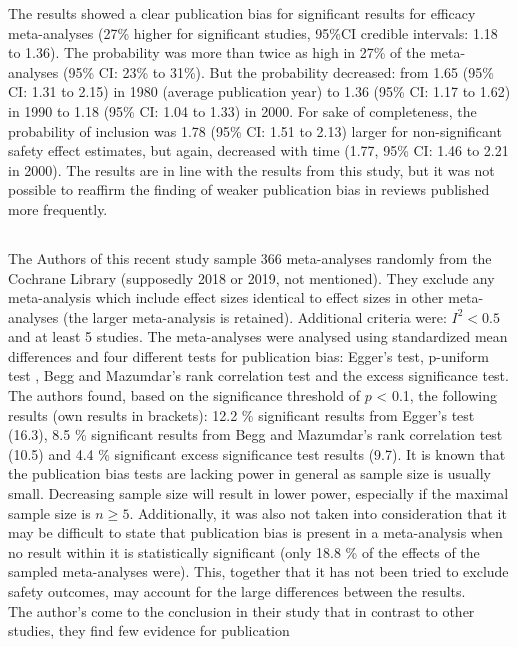 \documentclass[11pt,a4paper,twoside]{book}\usepackage[]{graphicx}\usepackage[]{color}
\begin{document}
The results showed a clear publication bias for significant results for efficacy meta-analyses (27\% higher for significant studies, 95\%CI credible intervals: 1.18 to 1.36). The probability was more than twice as high in 27\% of the meta-analyses (95\% CI: 23\% to 31\%). But the probability decreased: from 1.65 (95\% CI: 1.31 to 2.15) in 1980 (average publication year) to 1.36 (95\% CI: 1.17 to 1.62) in 1990 to 1.18 (95\% CI: 1.04 to 1.33) in 2000. For sake of completeness, the probability of inclusion was  1.78 (95\% CI: 1.51 to 2.13) larger for non-significant safety effect estimates, but again, decreased with time (1.77, 95\% CI: 1.46 to 2.21 in 2000). The results are in line with the results from this study, but it was not possible to reaffirm the finding of weaker publication bias in reviews published more frequently.\\

\subsection{\citet{vanAert.2019}}
The Authors of this recent study sample 366 meta-analyses randomly from the Cochrane Library (supposedly 2018 or 2019, not mentioned). They exclude any meta-analysis which include effect sizes identical to effect sizes in other meta-analyses (the larger meta-analysis is retained). Additional criteria were: $I^2 < 0.5$ and at least 5 studies. The meta-analyses were analysed using standardized mean differences and four different tests for publication bias: Egger's test, p-uniform test \citep{p.uniform}, Begg and Mazumdar's rank correlation test and the excess significance test. \\
The authors found, based on the significance threshold of $p$ < 0.1, the following results (own results in brackets):
12.2 \% significant results from Egger's test (16.3),
8.5 \% significant results from Begg and Mazumdar's rank correlation test (10.5) and
4.4 \% significant excess significance test results (9.7).
It is known that the publication bias tests are lacking power in general as sample size is usually small. Decreasing sample size will result in lower power, especially if the maximal sample size is $n \geq 5$. Additionally, it was also not taken into consideration that it may be difficult to state that publication bias is present in a meta-analysis when no result within it is statistically significant (only 18.8 \% of the effects of the sampled meta-analyses were). This, together that it has not been tried to exclude safety outcomes, may account for the large differences between the results. \\
The author's come to the conclusion in their study that in contrast to other studies, they find few evidence for publication
\end{document}
